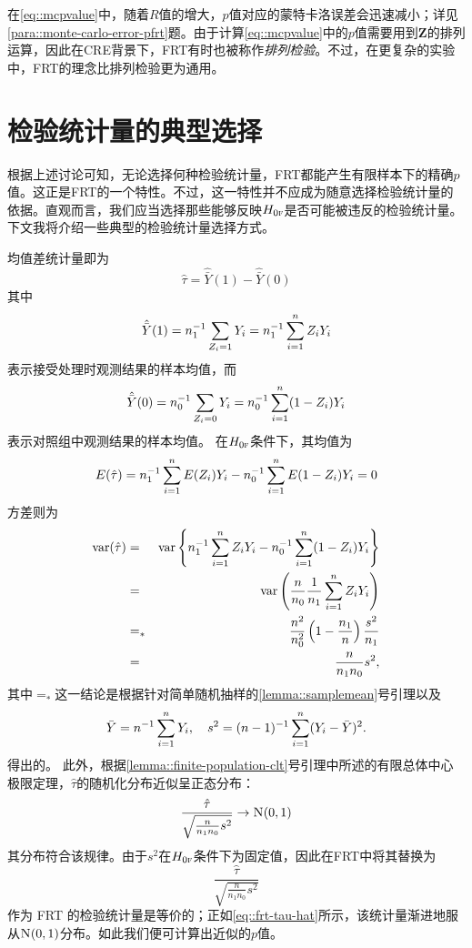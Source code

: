 在\eqref{eq::mcpvalue}中，随着$R$值的增大，$p$值对应的蒙特卡洛误差会迅速减小；详见\ref{para::monte-carlo-error-pfrt}题。由于计算\eqref{eq::mcpvalue}中的$p$值需要用到$\bm{Z}$的排列运算，因此在CRE背景下，FRT有时也被称作{\it 排列检验}。不过，在更复杂的实验中，FRT的理念比排列检验更为通用。



\section{检验统计量的典型选择}
\label{sec::frt-choiceofstatistic}

根据上述讨论可知，无论选择何种检验统计量，FRT都能产生有限样本下的精确$p$值。这正是FRT的一个特性。不过，这一特性并不应成为随意选择检验统计量的依据。直观而言，我们应当选择那些能够反映$H_{0\textsc{f}}$是否可能被违反的检验统计量。下文我将介绍一些典型的检验统计量选择方式。 


\begin{example}[均值差法]\label{eq::frt-difference-in-means}
均值差统计量即为
$$
\hat{\tau}   = \hat{\bar{Y}}(1) - \hat{\bar{Y}}(0)
$$
其中
$$
 \hat{\bar{Y}}(1)  =  n_1^{-1} \sum_{Z_i=1} Y_i  = n_1^{-1} \sum_{i=1}^n Z_iY_i 
$$
表示接受处理时观测结果的样本均值，而
$$
\hat{\bar{Y}}(0) = n_0^{-1}  \sum_{Z_i=0} Y_i   = n_0^{-1}  \sum_{i=1}^n (1-Z_i) Y_i 
$$
表示对照组中观测结果的样本均值。
%
在$H_{0\textsc{f}}$条件下，其均值为
$$
E(  \hat{\tau}    ) = n_1^{-1}\sum_{i=1}^n E(Z_i)Y_i  - n_0^{-1}  \sum_{i=1}^n E(1-Z_i) Y_i  = 0
$$
方差则为
\begin{eqnarray*}
\textup{var}( \hat{\tau}   ) &=& \textup{var}\left\{  n_1^{-1} \sum_{i=1}^n Z_iY_i - n_0^{-1}  \sum_{i=1}^n (1-Z_i) Y_i  \right\} \\
&=&\textup{var}\left(  \frac{n}{n_0}    \frac{1}{n_1} \sum_{i=1}^n  Z_i Y_i         \right) \\
&=_*& \frac{n^2}{n_0^2} \left( 1 - \frac{n_1}{n} \right) \frac{s^2}{n_1} \\ 
&=& \frac{n}{n_1 n_0} s^2,
\end{eqnarray*}
其中$=_*$这一结论是根据针对简单随机抽样的\ref{lemma::samplemean}号引理以及$$
\bar{Y} = n^{-1}  \sum_{i=1}^n Y_i,\quad 
s^2 = (n-1)^{-1} \sum_{i=1}^n (Y_i - \bar{Y})^2 .  
$$得出的。
此外，根据\ref{lemma::finite-population-clt}号引理中所述的有限总体中心极限定理，$\hat{\tau}$的随机化分布近似呈正态分布：
\begin{equation}\label{eq::frt-tau-hat}
\frac{  \hat{\tau}      }{  \sqrt{\frac{n}{n_1 n_0} s^2}    }  
\rightarrow  \N01 
\end{equation}
其分布符合该规律。由于$s^2$在$H_{0\textsc{f}}$条件下为固定值，因此在FRT中将其替换为$$
\frac{  \hat{\tau}      }{  \sqrt{\frac{n}{n_1 n_0} s^2}    }  
$$作为 FRT 的检验统计量是等价的；正如\eqref{eq::frt-tau-hat}所示，该统计量渐进地服从$\textsc{N}(0,1)$分布。如此我们便可计算出近似的$p$值。
\end{example}


